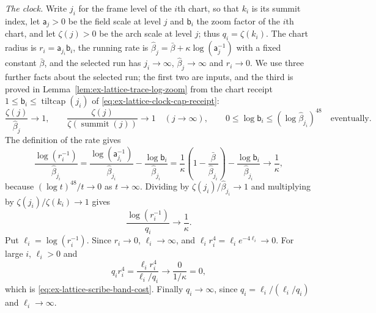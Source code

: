 \emph{The clock.} Write $j_i$ for the frame level of the $i$th chart, so
that $k_i$ is its summit index, let $\mathsf a_j>0$ be the field scale at
level $j$ and $\mathsf b_i$ the zoom factor of the $i$th chart, and let
$\zeta(j)>0$ be the arch scale at level $j$; thus $q_i=\zeta(k_i)$. The
chart radius is $r_i=\mathsf a_{j_i}\mathsf b_i$, the running rate is
$\widehat\beta_j=\bar\beta+\kappa\log(\mathsf a_j^{-1})$ with a fixed
constant $\bar\beta$, and the selected run has $j_i\to\infty$,
$\widehat\beta_j\to\infty$ and $r_i\to0$. We use three further facts about
the selected run; the first two are inputs, and the third is proved in
Lemma~\ref{lem:ex-lattice-trace-log-zoom} from the chart receipt
$1\le\mathsf b_i\le\operatorname{tiltcap}(j_i)$
of \eqref{eq:ex-lattice-clock-cap-receipt}:
\begin{equation}
 \frac{\zeta(j)}{\widehat\beta_j}\longrightarrow1,\qquad
 \frac{\zeta(j)}{\zeta(\operatorname{summit}(j))}\longrightarrow1
 \quad(j\to\infty),\qquad
 0\le\log\mathsf b_i\le(\log\widehat\beta_{j_i})^{48}
 \quad\text{eventually}.
 \label{eq:ex-lattice-scribe-clock-inputs}
\end{equation}
The definition of the rate gives
\[
 \frac{\log(r_i^{-1})}{\widehat\beta_{j_i}}
 =\frac{\log(\mathsf a_{j_i}^{-1})}{\widehat\beta_{j_i}}
   -\frac{\log\mathsf b_i}{\widehat\beta_{j_i}}
 =\frac1\kappa\left(1-\frac{\bar\beta}{\widehat\beta_{j_i}}\right)
   -\frac{\log\mathsf b_i}{\widehat\beta_{j_i}}
 \longrightarrow\frac1\kappa,
\]
because $(\log t)^{48}/t\to0$ as $t\to\infty$. Dividing by
$\zeta(j_i)/\widehat\beta_{j_i}\to1$ and multiplying by
$\zeta(j_i)/\zeta(k_i)\to1$ gives
\begin{equation}
 \frac{\log(r_i^{-1})}{q_i}\longrightarrow\frac1\kappa.
 \label{eq:ex-lattice-scribe-clock}
\end{equation}
Put $\ell_i=\log(r_i^{-1})$. Since $r_i\to0$, $\ell_i\to\infty$, and
$\ell_ir_i^4=\ell_ie^{-4\ell_i}\to0$. For large $i$, $\ell_i>0$ and
\[
 q_ir_i^4=\frac{\ell_ir_i^4}{\ell_i/q_i}\longrightarrow\frac0{1/\kappa}=0,
\]
which is \eqref{eq:ex-lattice-scribe-band-cost}. Finally
$q_i\to\infty$, since $q_i=\ell_i/(\ell_i/q_i)$ and $\ell_i\to\infty$.


